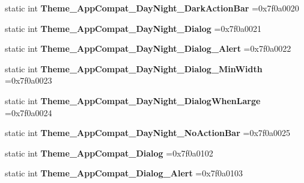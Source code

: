 \begin{DoxyCompactItemize}
static int {\bfseries Theme\+\_\+\+App\+Compat\+\_\+\+Day\+Night\+\_\+\+Dark\+Action\+Bar} =0x7f0a0020
\item 
\mbox{\label{classandroid_1_1support_1_1design_1_1R_1_1style_a89b788ed17643fbfd5369864a3eb69e7}} 
static int {\bfseries Theme\+\_\+\+App\+Compat\+\_\+\+Day\+Night\+\_\+\+Dialog} =0x7f0a0021
\item 
\mbox{\label{classandroid_1_1support_1_1design_1_1R_1_1style_adda77d33eb43b2837847762c36e364d1}} 
static int {\bfseries Theme\+\_\+\+App\+Compat\+\_\+\+Day\+Night\+\_\+\+Dialog\+\_\+\+Alert} =0x7f0a0022
\item 
\mbox{\label{classandroid_1_1support_1_1design_1_1R_1_1style_acaaed5b32465c558f034f2d1530d1da3}} 
static int {\bfseries Theme\+\_\+\+App\+Compat\+\_\+\+Day\+Night\+\_\+\+Dialog\+\_\+\+Min\+Width} =0x7f0a0023
\item 
\mbox{\label{classandroid_1_1support_1_1design_1_1R_1_1style_a3eac5e10f62f6b98617c9519b981e220}} 
static int {\bfseries Theme\+\_\+\+App\+Compat\+\_\+\+Day\+Night\+\_\+\+Dialog\+When\+Large} =0x7f0a0024
\item 
\mbox{\label{classandroid_1_1support_1_1design_1_1R_1_1style_a2aaecac86f7ec469a60994f110c5d74c}} 
static int {\bfseries Theme\+\_\+\+App\+Compat\+\_\+\+Day\+Night\+\_\+\+No\+Action\+Bar} =0x7f0a0025
\item 
\mbox{\label{classandroid_1_1support_1_1design_1_1R_1_1style_a45282b5f0338198fb9c9b8abb5a347f0}} 
static int {\bfseries Theme\+\_\+\+App\+Compat\+\_\+\+Dialog} =0x7f0a0102
\item 
\mbox{\label{classandroid_1_1support_1_1design_1_1R_1_1style_a0d4abe06d114a927448698797d1e5ab8}} 
static int {\bfseries Theme\+\_\+\+App\+Compat\+\_\+\+Dialog\+\_\+\+Alert} =0x7f0a0103
\item 
\mbox{\label{classandroid_1_1support_1_1design_1_1R_1_1style_a14a3189cf69b3bc4346fca2770f0a712}} 

\end{DoxyCompactItemize}
